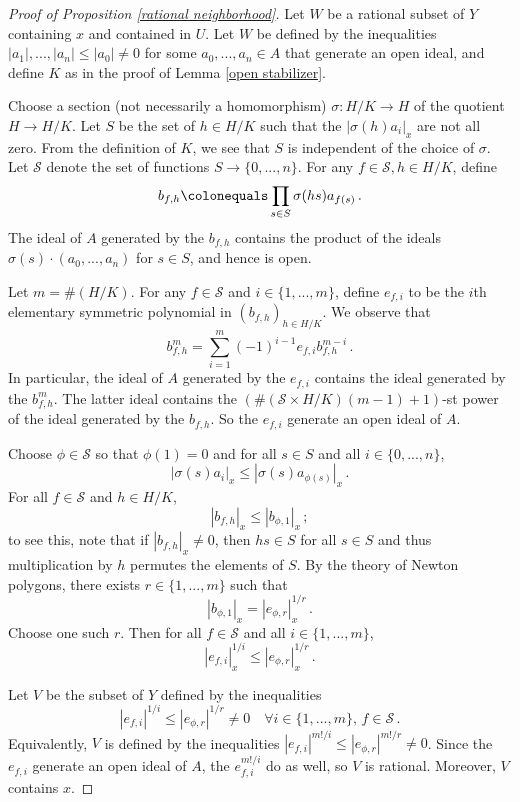 \documentclass{amsart}
\theoremstyle{remark}
\numberwithin{equation}{subsection}
\newcommand{\defeq}{\colonequals}
\renewcommand{\(}{\left(}
\renewcommand{\)}{\right)}
\begin{document}
\begin{proof}[Proof of Proposition \ref{rational neighborhood}]
Let $W$ be a rational subset of $Y$ containing $x$ and contained in $U$.
Let $W$ be defined by the inequalities $|a_1|, ..., |a_n| \le |a_0| \ne 0$
for some $a_0,...,a_n \in A$ that generate an open ideal, and define $K$
as in the proof of Lemma \ref{open stabilizer}.

Choose a section (not necessarily a homomorphism) $\sigma\colon H/K \to H$ of the quotient $H \to H/K$.
Let $S$ be the set of $h \in H/K$ such that the $|\sigma(h) a_i|_x$
are not all zero.  From the definition of $K$, we see that
$S$ is independent of the choice of $\sigma$.
Let $\mathscr{S}$ denote the set of functions $S \to \{0,...,n\}$.
For any $f \in \mathscr{S}, h \in H/K$, define
\[ b_{f,h} \defeq \prod_{s \in S} \sigma(hs) a_{f(s)} \,. \]
The ideal of $A$ generated by the $b_{f,h}$ contains the product of the ideals
$\sigma(s) \cdot (a_0,...,a_n)$ for $s \in S$, and hence is open.

Let $m = \#(H/K)$.
For any $f \in \mathscr{S}$ and $i \in \{1,...,m\}$,
define $e_{f,i}$ to be the $i$th elementary symmetric polynomial in
$(b_{f,h})_{h \in H/K}$.
We observe that
\[ b_{f,h}^{m} = \sum_{i=1}^{m} (-1)^{i-1} e_{f,i} b_{f,h}^{m-i} \,. \]
In particular, the ideal of $A$ generated by the $e_{f,i}$ contains the ideal
generated by the $b_{f,h}^{m}$.  The latter ideal contains the
$\left(\#(\mathscr{S} \times H/K) (m-1) + 1\right)$-st power of the ideal generated by the $b_{f,h}$.
So the $e_{f,i}$ generate an open ideal of $A$.

Choose $\phi \in \mathscr{S}$ so that $\phi(1)=0$ and
for all $s \in S$ and all $i \in \{0,...,n\}$,
\[|\sigma(s) a_i|_x \le |\sigma(s) a_{\phi(s)}|_x  \,. \]
For all $f \in \mathscr{S}$ and $h \in H/K$,
\[|b_{f,h}|_x \le |b_{\phi,1}|_x \,; \]
to see this, note that if $|b_{f,h}|_x \ne 0$, then $hs \in S$ for all $s \in S$ and thus multiplication by $h$ permutes the elements of $S$.
By the theory of Newton polygons, there exists $r \in \{1,...,m\}$
such that
\[ |b_{\phi,1}|_x = |e_{\phi,r}|_x^{1/r} \,. \]
Choose one such $r$.  Then for all $f \in \mathscr{S}$ and all
$i \in \{1,...,m\}$,
\[ |e_{f,i}|_x^{1/i} \le  |e_{\phi,r}|_x^{1/r} \,. \]

Let $V$ be the subset of $Y$ defined by the inequalities
\[ |e_{f,i}|^{1/i} \le |e_{\phi,r}|^{1/r} \ne 0 \quad \forall i \in \{1,...,m\},\, f \in \mathscr{S} \,. \]
Equivalently, $V$ is defined by the inequalities $|e_{f,i}|^{m!/i} \le |e_{\phi,r}|^{m!/r} \ne 0 $.
Since the $e_{f,i}$ generate an open ideal of $A$, the $e_{f,i}^{m!/i}$ do as well, so $V$ is rational.
Moreover, $V$ contains $x$.


\end{proof}
\end{document}
